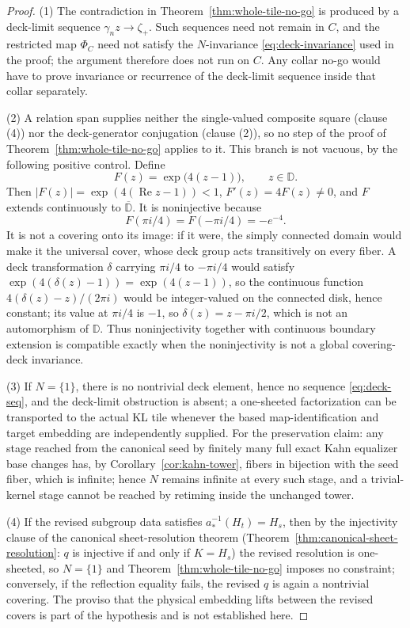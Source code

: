 \begin{proof}
(1)  The contradiction in Theorem~\ref{thm:whole-tile-no-go} is produced by a deck-limit sequence \(\gamma_nz\to\zeta_+\).  Such sequences need not remain in \(C\), and the restricted map \(\Phi_C\) need not satisfy the \(N\)-invariance \eqref{eq:deck-invariance} used in the proof; the argument therefore does not run on \(C\).  Any collar no-go would have to prove invariance or recurrence of the deck-limit sequence inside that collar separately.

(2)  A relation span supplies neither the single-valued composite square (clause (4)) nor the deck-generator conjugation (clause (2)), so no step of the proof of Theorem~\ref{thm:whole-tile-no-go} applies to it.  This branch is not vacuous, by the following positive control.  Define
\[
F(z)=\exp\bigl(4(z-1)\bigr),\qquad z\in\mathbb D.
\]
Then \(|F(z)|=\exp(4(\operatorname{Re}z-1))<1\), \(F'(z)=4F(z)\ne0\), and \(F\) extends continuously to \(\overline{\mathbb D}\).  It is noninjective because
\[
F(\pi i/4)=F(-\pi i/4)=-e^{-4}.
\]
It is not a covering onto its image: if it were, the simply connected domain would make it the universal cover, whose deck group acts transitively on every fiber.  A deck transformation \(\delta\) carrying \(\pi i/4\) to \(-\pi i/4\) would satisfy \(\exp(4(\delta(z)-1))=\exp(4(z-1))\), so the continuous function \(4(\delta(z)-z)/(2\pi i)\) would be integer-valued on the connected disk, hence constant; its value at \(\pi i/4\) is \(-1\), so \(\delta(z)=z-\pi i/2\), which is not an automorphism of \(\mathbb D\).  Thus noninjectivity together with continuous boundary extension is compatible exactly when the noninjectivity is not a global covering-deck invariance.

(3)  If \(N=\{1\}\), there is no nontrivial deck element, hence no sequence \eqref{eq:deck-seq}, and the deck-limit obstruction is absent; a one-sheeted factorization can be transported to the actual KL tile whenever the based map-identification and target embedding are independently supplied.  For the preservation claim: any stage reached from the canonical seed by finitely many full exact Kahn equalizer base changes has, by Corollary~\ref{cor:kahn-tower}, fibers in bijection with the seed fiber, which is infinite; hence \(N\) remains infinite at every such stage, and a trivial-kernel stage cannot be reached by retiming inside the unchanged tower.

(4)  If the revised subgroup data satisfies \(a_*^{-1}(H_t)=H_s\), then by the injectivity clause of the canonical sheet-resolution theorem (Theorem~\ref{thm:canonical-sheet-resolution}: \(q\) is injective if and only if \(K=H_s\)) the revised resolution is one-sheeted, so \(N=\{1\}\) and Theorem~\ref{thm:whole-tile-no-go} imposes no constraint; conversely, if the reflection equality fails, the revised \(q\) is again a nontrivial covering.  The proviso that the physical embedding lifts between the revised covers is part of the hypothesis and is not established here.
\end{proof}